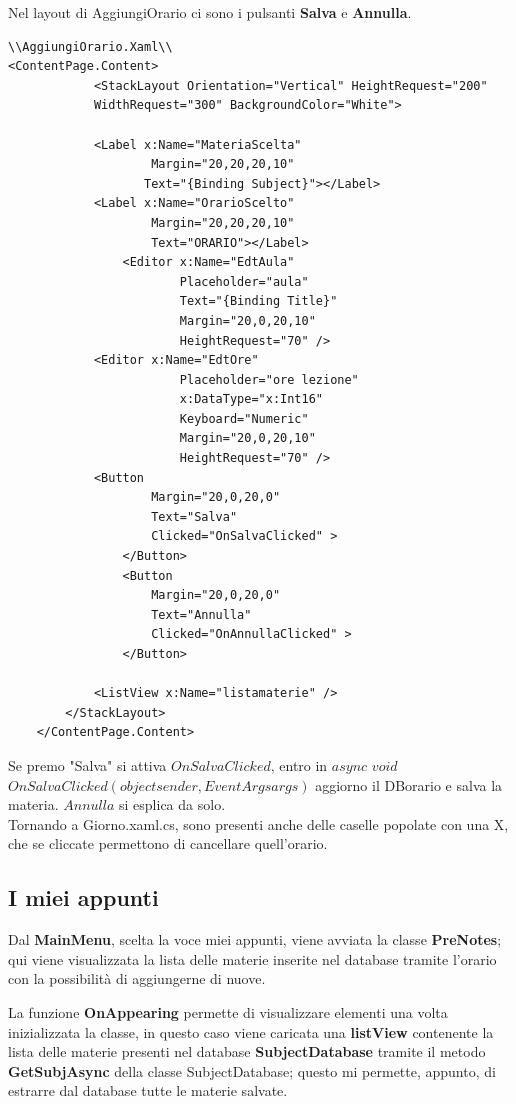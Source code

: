 \documentclass[a4paper, 50pt, twoside]{article}
\begin{document}
Nel layout di AggiungiOrario ci sono i pulsanti \textbf{Salva} e \textbf{Annulla}.
\begin{lstlisting}
\\AggiungiOrario.Xaml\\
<ContentPage.Content>
            <StackLayout Orientation="Vertical" HeightRequest="200" 
			WidthRequest="300" BackgroundColor="White">

            <Label x:Name="MateriaScelta"
                    Margin="20,20,20,10" 
                   Text="{Binding Subject}"></Label>
            <Label x:Name="OrarioScelto"
                    Margin="20,20,20,10" 
                    Text="ORARIO"></Label>
                <Editor x:Name="EdtAula"
                        Placeholder="aula"
                        Text="{Binding Title}"
                        Margin="20,0,20,10"
                        HeightRequest="70" />
            <Editor x:Name="EdtOre"
                        Placeholder="ore lezione"
                        x:DataType="x:Int16"
                        Keyboard="Numeric"
                        Margin="20,0,20,10"
                        HeightRequest="70" />
            <Button 
                    Margin="20,0,20,0" 
                    Text="Salva"
                    Clicked="OnSalvaClicked" >
                </Button>
                <Button 
                    Margin="20,0,20,0" 
                    Text="Annulla"
                    Clicked="OnAnnullaClicked" >                    
                </Button>

            <ListView x:Name="listamaterie" />
        </StackLayout>
    </ContentPage.Content>
\end{lstlisting}
Se premo "Salva" si attiva  $OnSalvaClicked$, entro in $async$ $void$ $OnSalvaClicked(object sender, EventArgs args)$ aggiorno il DBorario e salva la materia.
$Annulla$ si esplica da solo. 
\\
Tornando a Giorno.xaml.cs, sono presenti anche delle caselle popolate con una X, che se cliccate permettono di cancellare quell'orario.
\subsection{I miei appunti}
Dal \textbf{MainMenu}, scelta la voce miei appunti, viene avviata la classe \textbf{PreNotes}; qui viene visualizzata la lista delle materie inserite nel database tramite l'orario con la possibilità di aggiungerne di nuove.

La funzione \textbf{OnAppearing} permette di visualizzare elementi una volta inizializzata la classe, in questo caso viene caricata una \textbf{listView} contenente la lista delle materie presenti nel database \textbf{SubjectDatabase} tramite il metodo \textbf{GetSubjAsync} della classe SubjectDatabase; questo mi permette, appunto, di estrarre dal database tutte le materie salvate.
\end{document}
